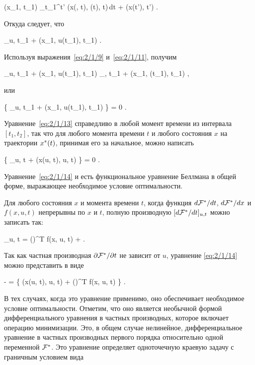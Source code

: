     \optF(x_1, t_1) \leqslant \int\limits_{t_1}^{t'} \funcL\bigl(x(\optU, t), \optU(t), t\bigr)\,dt + \optF\bigl(x(t'), t'\bigr) \mbox{.}
\eeq

Откуда следует, что

    _{u, t_1} + \funcL\bigl(x_1, u(t_1), t_1\bigr)  \mbox{.}
\eeq

Используя выражения~\vref{eq:2/1/9} и~\ref{eq:2/1/11}, получим

    _{u, t_1} + \funcL\bigl(x_1, u(t_1), t_1\bigr) \geqslant {}_{\optU, t_1} + \funcL\bigl(x_1, \optU(t_1), t_1\bigr) \mbox{,}
\eeq

или

     \biggl\{ _{u, t_1} + \funcL\bigl(x_1, u(t_1), t_1\bigr) \biggr\} = 0 \mbox{.}
\eeq

Уравнение~\ref{eq:2/1/13} справедливо в любой момент времени из интервала $[t_1, t_2]$, так что для любого момента времени $t$ и любого состояния $x$ на траектории $x^{*}(t)$, принимая его за начальное, можно написать

     \biggl\{ _{u, t} + \funcL\bigl(x(u, t), u, t\bigr) \biggr\} = 0 \mbox{.}
\eeq

Уравнение~\ref{eq:2/1/14} и есть функциональное уравнение Беллмана в общей форме, выражающее необходимое условие оптимальности.

Для любого состояния $x$ и момента времени $t$, когда функция $d \mathcal{F}^{*} / d t$, $d \mathcal{F}^{*} / d x$ и $f(x, u, t)$ непрерывны по $x$ и $t$, полную производную $[d \mathcal{F}^{*} / d t]_{u, t}$ можно записать так:

    _{u, t} = \biggl(\biggr)^T f(x, u, t) +  \mbox{.}
\eeq

Так как частная производная $\partial {   \mathcal{F} ^{*}  } / \partial {t}$ не зависит от $u$, уравнение \ref{eq:2/1/14} можно представить в виде

    -  =  \Biggl\{ \funcL\bigl(x(u, t), u, t\bigr) + \biggl(\biggr)^T f(x, u, t) \Biggr\} \mbox{.}
\eeq

В тех случаях, когда это уравнение применимо, оно обеспечивает необходимое условие оптимальности. Отметим, что оно является необычной формой дифференциального уравнения в частных производных, которое включает операцию минимизации. Это, в общем случае нелинейное, дифференциальное уравнение в частных производных первого порядка относительно одной переменной $\mathcal{F}^{*}$. Это уравнение определяет одноточечную краевую задачу с граничным условием вида

